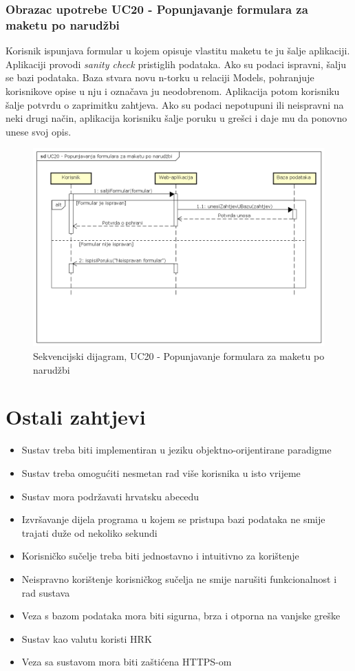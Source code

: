 				\subsubsection{Obrazac upotrebe UC20 - Popunjavanje formulara za maketu po narudžbi}
					\noindent Korisnik ispunjava formular u kojem opisuje vlastitu maketu te ju šalje aplikaciji. Aplikaciji provodi \textit{sanity check} pristiglih podataka. Ako su podaci ispravni, šalju se bazi podataka. Baza stvara novu n-torku u relaciji Models, pohranjuje korisnikove opise u nju i označava ju neodobrenom. Aplikacija potom korisniku šalje potvrdu o zaprimitku zahtjeva. Ako su podaci nepotupuni ili neispravni na neki drugi način, aplikacija korisniku šalje poruku u grešci i daje mu da ponovno unese svoj opis.
					\begin{figure}[H]
						\includegraphics[width=.9\linewidth]{dijagrami/SD_UC20.png}
						\centering
						\caption{Sekvencijski dijagram, UC20 - Popunjavanje formulara za maketu po narudžbi}
						\label{fig:sekvdija3}
					\end{figure}
				
			\eject
	
		\section{Ostali zahtjevi}
		
			\begin{itemize}
				\item Sustav treba biti implementiran u jeziku objektno-orijentirane paradigme
				\item Sustav treba omogućiti nesmetan rad više korisnika u isto vrijeme
				\item Sustav mora podržavati hrvatsku abecedu
				\item Izvršavanje dijela programa u kojem se pristupa bazi podataka ne smije trajati duže od nekoliko sekundi
				\item Korisničko sučelje treba biti jednostavno i intuitivno za korištenje
				\item Neispravno korištenje korisničkog sučelja ne smije narušiti funkcionalnost i rad sustava
				\item Veza s bazom podataka mora biti sigurna, brza i otporna na vanjske greške
				\item Sustav kao valutu koristi HRK
				\item Veza sa sustavom mora biti zaštićena HTTPS-om
			\end{itemize}
			
			 
			 
			 
	